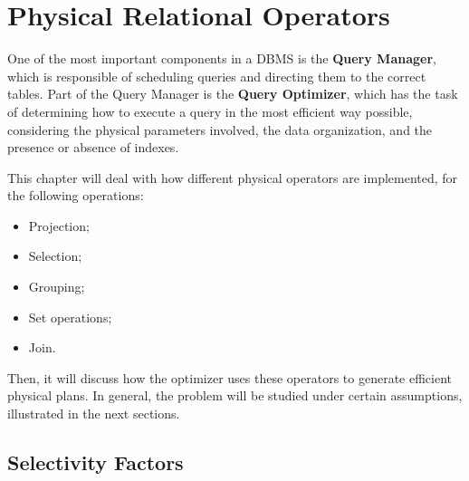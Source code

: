 \chapter{Physical Relational Operators}

One of the most important components in a DBMS is the \textbf{Query Manager}, which is responsible of scheduling queries and directing them to the correct tables. Part of the Query Manager is the \textbf{Query Optimizer}, which has the task of determining how to execute a query in the most efficient way possible, considering the physical parameters involved, the data organization, and the presence or absence of indexes.

This chapter will deal with how different physical operators are implemented, for the following operations:
\begin{itemize}
    \item Projection;
    \item Selection;
    \item Grouping;
    \item Set operations;
    \item Join.
\end{itemize}
Then, it will discuss how the optimizer uses these operators to generate efficient physical plans. In general, the problem will be studied under certain assumptions, illustrated in the next sections.

\section{Selectivity Factors}

